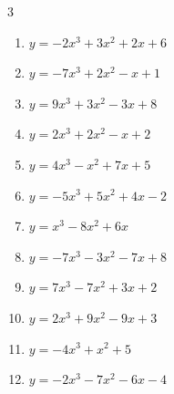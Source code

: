 \begin{multicols}{3}
\begin{enumerate}
  \item $y=-2x^{3}+3x^{2}+2x+6$


  \item $y=-7x^{3}+2x^{2}-x+1$


  \item $y=9x^{3}+3x^{2}-3x+8$


  \item $y=2x^{3}+2x^{2}-x+2$


  \item $y=4x^{3}-x^{2}+7x+5$


\columnbreak %

\resetques

  \item $y=-5x^{3}+5x^{2}+4x-2$


  \item $y=x^{3}-8x^{2}+6x$


  \item $y=-7x^{3}-3x^{2}-7x+8$


  \item $y=7x^{3}-7x^{2}+3x+2$


  \item $y=2x^{3}+9x^{2}-9x+3$


  \item $y=-4x^{3}+x^{2}+5$


  \item $y=-2x^{3}-7x^{2}-6x-4$



\end{enumerate}
\end{multicols}
